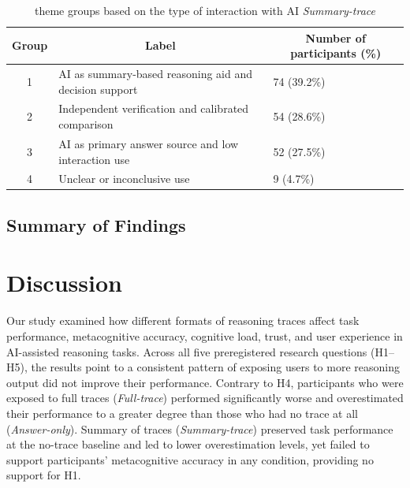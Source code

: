 \documentclass[acmlarge,review=true, anonymous=true]{acmart}
\newcommand{\daniela}[1]{\textcolor{colordaniela}{\textbf{\faComment~Daniela:} #1}}
\begin{document}
\begin{table}[!htp]
\centering
\begin{tabular}{cll}
\hline
Group & \multicolumn{1}{c}{Label}                            & \multicolumn{1}{c}{Number of participants (\%)} \\ \hline
1     & AI as summary-based reasoning aid and decision support & 74 (39.2\%)                                     \\
2     & Independent verification and calibrated comparison     & 54 (28.6\%)                                     \\
3     & AI as primary answer source and low interaction use    & 52 (27.5\%)                                     \\
4     & Unclear or inconclusive use              & 9 (4.7\%)  \\           
\hline
\end{tabular}
\caption{theme groups based on the type of interaction with AI \textit{Summary-trace}}
\label{tab:qualitative_C3}
\end{table}




\subsection{Summary of Findings}

\section{Discussion}

Our study examined how different formats of reasoning traces affect task performance, metacognitive accuracy, cognitive load, trust, and user experience in AI-assisted reasoning tasks. Across all five preregistered research questions (H1--H5), the results point to a consistent pattern of exposing users to more reasoning output did not improve their performance. Contrary to H4, participants who were exposed to full traces (\textit{Full-trace}) performed significantly worse and overestimated their performance to a greater degree than those who had no trace at all (\textit{Answer-only}). Summary of traces (\textit{Summary-trace}) preserved task performance at the no-trace baseline and led to lower overestimation levels, yet failed to support participants' metacognitive accuracy in any condition, providing no support for H1.
\end{document}

